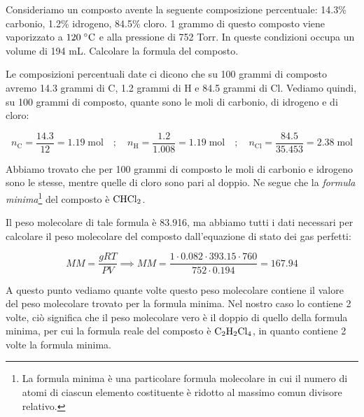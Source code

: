 \newpage

\begin{esercizio}[$\bigstar$]
    Consideriamo un composto avente la seguente composizione percentuale: 14.3\% carbonio, 1.2\% idrogeno, 84.5\% cloro. 1 grammo di questo composto viene vaporizzato a $120 \; \rm ^{\circ}C$ e alla pressione di 752 Torr. In queste condizioni occupa un volume di 194 mL. Calcolare la formula del composto.
\end{esercizio}
\begin{soluzione}
    Le composizioni percentuali date ci dicono che su 100 grammi di composto avremo 14.3 grammi di C, 1.2 grammi di H e 84.5 grammi di Cl. Vediamo quindi, su 100 grammi di composto, quante sono le moli di carbonio, di idrogeno e di cloro:

$$n_{\text{C}}=\frac{14.3}{12}=1.19 \; \text{mol}
\quad;\quad
n_{\text{H}}=\frac{1.2}{1.008}=1.19 \; \text{mol}
\quad;\quad
n_{\text{Cl}}=\frac{84.5}{35.453}=2.38 \; \text{mol}$$

Abbiamo trovato che per 100 grammi di composto le moli di carbonio e idrogeno sono le stesse, mentre quelle di cloro sono pari al doppio. Ne segue che la \textit{formula minima}\footnote{La formula minima è una particolare formula molecolare in cui il numero di atomi di ciascun elemento costituente è ridotto al massimo comun divisore relativo.} del composto è $\rm CHCl_2$.

Il peso molecolare di tale formula è 83.916, ma abbiamo tutti i dati necessari per calcolare il peso molecolare del composto dall'equazione di stato dei gas perfetti:

$$MM=\frac{gRT}{PV} \implies MM=\frac{1 \cdot 0.082 \cdot 393.15 \cdot 760}{752 \cdot 0.194}=167.94$$

A questo punto vediamo quante volte questo peso molecolare contiene il valore del peso molecolare trovato per la formula minima. Nel nostro caso lo contiene 2 volte, ciò significa che il peso molecolare vero è il doppio di quello della formula minima, per cui la formula reale del composto è $\rm C_2H_2Cl_4$, in quanto contiene 2 volte la formula minima.

\end{soluzione}

\newpage

